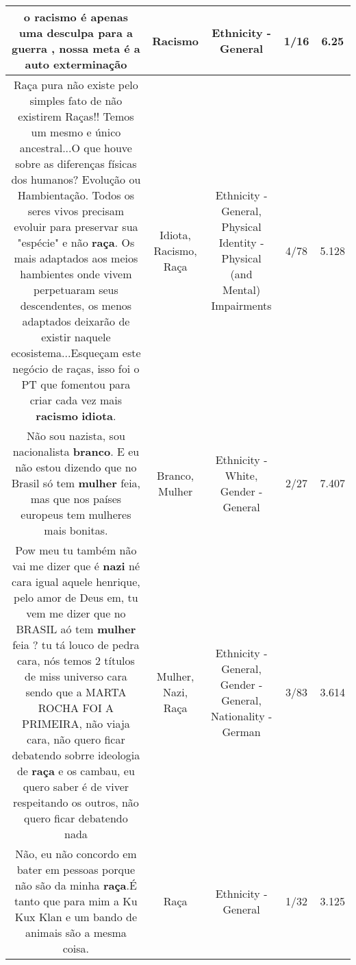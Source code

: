 \documentclass[11pt]{article}
\newlength\mylength
\begin{document}
\begin{center}
\begin{longtable}{|C{.65\mylength}|C{.30\mylength}|C{.12\mylength}|C{.12\mylength}|C{.12\mylength}|}
  \small o \textbf{racismo} é apenas uma desculpa para a guerra , nossa meta é a auto exterminação\normalsize   & Racismo & Ethnicity - General & 1/16 & 6.25 \\  \hline
  \small Raça pura não existe pelo simples fato de não existirem Raças!! Temos um mesmo e único ancestral...O que houve sobre as diferenças físicas dos humanos? Evolução ou Hambientação. Todos os seres vivos precisam evoluir para preservar sua "espécie"  e não \textbf{raça}. Os mais adaptados aos meios hambientes onde vivem perpetuaram seus descendentes, os menos adaptados deixarão de existir naquele ecosistema...Esqueçam este negócio de raças, isso foi o PT que fomentou para criar cada vez mais \textbf{racismo} \textbf{idiota}.\normalsize   & Idiota, Racismo, Raça & Ethnicity - General, Physical Identity - Physical (and Mental) Impairments & 4/78 & 5.128 \\  \hline
  \small Não sou nazista, sou nacionalista \textbf{branco}. E eu não estou dizendo que no Brasil só tem \textbf{mulher} feia, mas que nos países europeus tem mulheres mais bonitas.\normalsize   & Branco, Mulher & Ethnicity - White, Gender - General & 2/27 & 7.407 \\  \hline
  \small Pow meu tu também não vai me dizer que é \textbf{nazi} né cara igual aquele henrique, pelo amor de Deus em, tu vem me dizer que no BRASIL aó tem \textbf{mulher} feia ? tu tá louco de pedra cara, nós temos  2 títulos de miss universo cara sendo que a MARTA ROCHA FOI A PRIMEIRA, não viaja cara, não quero ficar debatendo sobrre ideologia de \textbf{raça} e os cambau, eu quero saber é de viver respeitando os outros, não quero ficar debatendo nada\normalsize   & Mulher, Nazi, Raça & Ethnicity - General, Gender - General, Nationality - German & 3/83 & 3.614 \\  \hline
  \small Não, eu não concordo em bater em pessoas porque não são da minha \textbf{raça}.É tanto que para mim a Ku Kux Klan e um bando de animais são a mesma coisa.\normalsize   & Raça & Ethnicity - General & 1/32 & 3.125 \\  \hline

\end{longtable}
\end{center}
\end{document}
